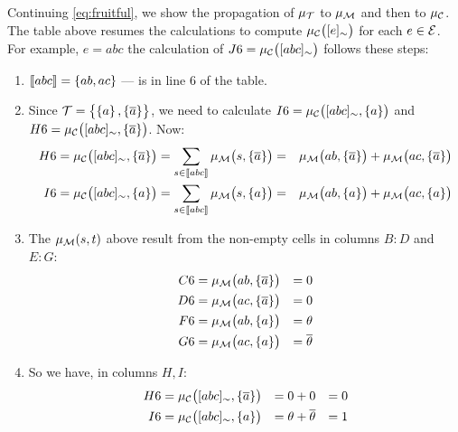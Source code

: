 \documentclass{article}
\begin{document}
Continuing \cref{eq:fruitful}, we show the propagation of \(\mu_{{\cal T}}\) to \(\mu_{{\cal M}}\)  and then to \(\mu_{\textrm{\ensuremath{{\cal C}}}}\).  The table above resumes the calculations to compute \(\pwc{\class{e}}\) for each \(e \in {\cal E}\). For example, \(e = abc\) the calculation of \(J6 = \pwc{\class{abc}}\) follows these steps:
\begin{enumerate}
	\item \(\left\llbracket abc \right\rrbracket = \set{ab,ac}\) --- is in line \(6\) of the table.
	\item Since \({\cal T} = \set{\set{a}, \set{\ensuremath{\overline{a}}}}\), we need to calculate \(I6 = \pwc{\class{abc}, \set{a}}\) and \(H6 = \pwc{\class{abc}, \set{\co{a}}}\).  Now:
	      \begin{equation*}
		      \begin{aligned}
			      H6 = \pwc{\class{abc}, \set{\co{a}}} & = \sum_{s \in \stablecore{abc}} \pwm{s, \set{\co{a}}}
			      =                                    & \pwm{ab, \set{\co{a}}} +  \pwm{ac, \set{\co{a}}}      \\
			      I6 = \pwc{\class{abc}, \set{a}}      & = \sum_{s \in \stablecore{abc}} \pwm{s, \set{a}}
			      =                                    & \pwm{ab, \set{a}} +  \pwm{ac, \set{a}}
		      \end{aligned}
	      \end{equation*}
	\item The \(\pwm{s,t}\) above result from the non-empty cells in columns \(B:D\) and \(E:G\):
	      \begin{equation*}
		      \begin{aligned}
			      C6 & = \pwm{ab, \set{\co{a}}} & = 0           \\
			      D6 & = \pwm{ac, \set{\co{a}}} & = 0           \\
			      F6 & = \pwm{ab, \set{a}}      & = \theta      \\
			      G6 & = \pwm{ac, \set{a}}      & = \co{\theta}
		      \end{aligned}
	      \end{equation*}
	\item So we have, in columns \(H, I\):
	      \begin{equation*}
		      \begin{aligned}
			      H6 & = \pwc{\class{abc}, \set{\co{a}}} & = 0 + 0                &  & = 0 \\
			      I6 & = \pwc{\class{abc}, \set{a}}      & = \theta + \co{\theta} &  & = 1
		      \end{aligned}
	      \end{equation*}

\end{enumerate}
\end{document}
